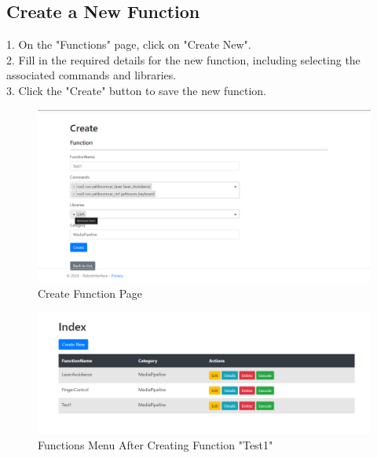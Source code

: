 \documentclass[12pt,a4paper]{scrbook}
\begin{document}
	\subsection{Create a New Function}
	1. On the "Functions" page, click on "Create New".\\
	2. Fill in the required details for the new function, including selecting the associated commands and libraries.\\
	3. Click the "Create" button to save the new function.\\
		\begin{figure}[H]
		\centering
		\includegraphics[width=\linewidth]{Images/create.png}
		\caption{Create Function Page}
		\label{}
	\end{figure}
		\begin{figure}[H]
		\centering
		\includegraphics[width=\linewidth]{Images/aftercreate.png}
		\caption{Functions Menu After Creating Function "Test1"}
		\label{}
	\end{figure}
	
\end{document}
